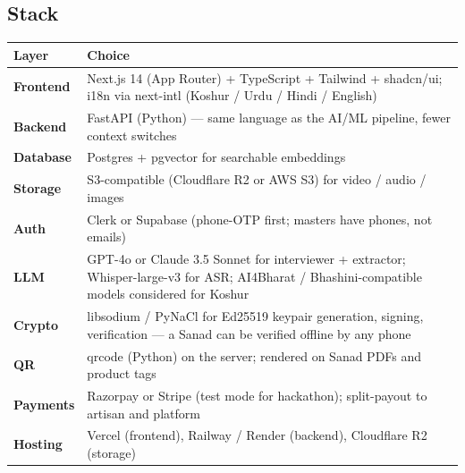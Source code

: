 \documentclass[11pt, a4paper]{article}
\begin{document}
\begin{center}
\end{center}

\subsection{Stack}

\begin{center}
\small
\begin{tabularx}{\linewidth}{>{\bfseries}lX}
\toprule
Layer & Choice \\
\midrule
Frontend & Next.js 14 (App Router) + TypeScript + Tailwind + shadcn/ui; i18n via next-intl (Koshur / Urdu / Hindi / English) \\
Backend & FastAPI (Python) --- same language as the AI/ML pipeline, fewer context switches \\
Database & Postgres + pgvector for searchable embeddings \\
Storage & S3-compatible (Cloudflare R2 or AWS S3) for video / audio / images \\
Auth & Clerk or Supabase (phone-OTP first; masters have phones, not emails) \\
LLM & GPT-4o or Claude 3.5 Sonnet for interviewer + extractor; Whisper-large-v3 for ASR; AI4Bharat / Bhashini-compatible models considered for Koshur \\
Crypto & libsodium / PyNaCl for Ed25519 keypair generation, signing, verification --- a Sanad can be verified offline by any phone \\
QR & qrcode (Python) on the server; rendered on Sanad PDFs and product tags \\
Payments & Razorpay or Stripe (test mode for hackathon); split-payout to artisan and platform \\
Hosting & Vercel (frontend), Railway / Render (backend), Cloudflare R2 (storage) \\
\bottomrule
\end{tabularx}
\end{center}
\end{document}
